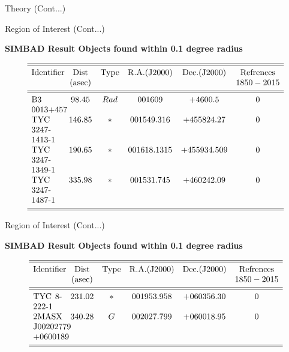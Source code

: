 \documentclass[12pt,a4paper]{beamer}
\begin{document}
\begin{frame}{Theory (Cont...)}
        \begin{frame}{Region of Interest (Cont...)}
\begin{block}{\centering\textbf{SIMBAD Result Objects found within 0.1 degree radius \cite{35}}}
\begin {table}[h]
$$
\begin{array}{p{0.1\linewidth}cccccc}
            \hline
            \hline
            \noalign{\smallskip}
            Identifier & {\rm Dist} & {\rm Type} & {\rm R.A.(J2000)} & {\rm Dec.(J2000)} & {\rm Refrences}\\
            &{\rm(asec)}&&&&{\rm 1850 - 2015}\\
            \noalign{\smallskip}
            \hline
            \hline
            \noalign{\smallskip}
   B3 0013+457     &   98.45   &   Rad  &   00 16 09        &   +46 0 0.5       &     0   \\
   TYC 3247-1413-1 &   146.85  &   *    &   00 15 49.316    &   +45 58 24.27    &     0   \\
   TYC 3247-1349-1 &   190.65  &   *    &   00 16 18.1315   &   +45 59 34.509   &     0   \\
   TYC 3247-1487-1 &   335.98  &   *    &   00 15 31.745    &   +46 02 42.09    &     0   \\
             \noalign{\smallskip}
            \hline
            \hline
         \end{array}
     $$
       \end{table}
\end{block}
\end{frame}

\begin{frame}{Region of Interest (Cont...)}
\begin{block}{\centering\textbf{SIMBAD Result Objects found within 0.1 degree radius \cite{35}}}
\begin {table}[h]
$$
\begin{array}{p{0.1\linewidth}cccccc}
            \hline
            \hline
            \noalign{\smallskip}
            Identifier & {\rm Dist} & {\rm Type} & {\rm R.A.(J2000)} & {\rm Dec.(J2000)} & {\rm Refrences}\\
            &{\rm(asec)}&&&&{\rm 1850 - 2015}\\
            \noalign{\smallskip}
            \hline
            \hline
            \noalign{\smallskip}
            TYC 8-222-1             &   231.02  &   *   &   00 19 53.958      &  +06 03 56.30    &     0   \\
            2MASX J00202779 +0600189 &   340.28  &   G   &   00 20 27.799      &  +06 00 18.95    &     0   \\
             \noalign{\smallskip}
            \hline
            \hline
         \end{array}
     $$
        \end{table}
\end{block}
\end{frame}


\end{frame}
\end{document}

